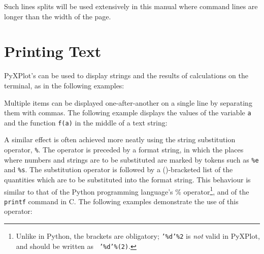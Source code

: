 \vspace{3mm}
\newline
{}\newline
{}
\vspace{3mm}

\noindent Such lines splits will be used extensively in this manual where
command lines are longer than the width of the page.

\section{Printing Text}

PyXPlot's  can be used to display strings and the results of
calculations on the terminal, as in the following examples:

\vspace{3mm}
\newline
{}\newline
{}\newline
{}\newline
{}
\vspace{3mm}

Multiple items can be displayed one-after-another on a single line by
separating them with commas. The following example displays the values of the
variable {\tt a} and the function {\tt f(a)} in the middle of a text string:

\vspace{3mm}
\newline
{}\newline
{}\newline
{}
\vspace{3mm}

A similar effect is often achieved more neatly using the string substitution
operator, {\tt \%}.  The operator is preceded by a format string, in
which the places where numbers and strings are to be substituted are marked by
tokens such as {\tt \%e} and {\tt \%s}. The substitution operator is followed
by a ()-bracketed list of the quantities which are to be substituted into the
format string. This behaviour is similar to that of the Python programming
language's \% operator\footnote{Unlike in Python, the brackets are obligatory;
{\tt '\%d'\%2} is {\it not} valid in PyXPlot, and should be written as {\tt
'\%d'\%(2)}.}, and of the {\tt printf} command in C.  The following examples
demonstrate the use of this operator:


